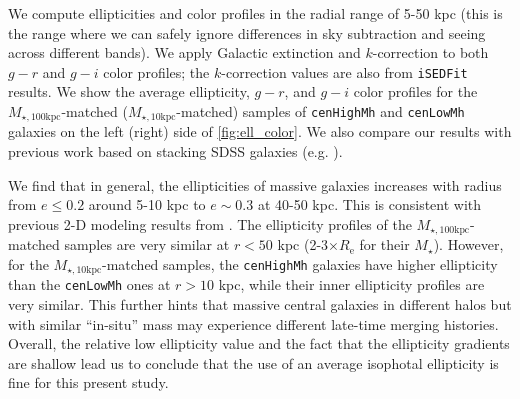 \documentclass[a4paper,fleqn,usenatbib]{mnras}
\def\rbcg{\texttt{cenHighMh}}
\def\nbcg{\texttt{cenLowMh}}
\def\mstar{{$M_{\star}$}}
\def\minn{{$M_{\star,10\mathrm{kpc}}$}}
\def\mtot{{$M_{\star,100\mathrm{kpc}}$}}
\def\m2l{{$M_{\star}/L_{\star}$}}
\def\mden{{$\mu_{\star}$}}
\begin{document}

    We compute ellipticities and color profiles in the radial range of 5-50 kpc 
    (this is the range where we can safely ignore differences in sky subtraction and 
    seeing across different bands). 
    We apply Galactic extinction and $k$-correction to both $g-r$ and $g-i$ color 
    profiles; the $k$-correction values are also from \texttt{iSEDFit} results.
    We show the average ellipticity, $g-r$, and $g-i$ color profiles for the 
    \mtot{}-matched (\minn{}-matched) samples of \rbcg{} and \nbcg{} galaxies on the 
    left (right) side of \ref{fig:ell_color}. 
    We also compare our results with previous work based on stacking SDSS galaxies 
    (e.g. \citealt{LaBarbera2010, Tal2011, DSouza2014}).
    
    We find that in general, the ellipticities of massive galaxies increases with 
    radius from $e\le 0.2$ around 5-10 kpc to $e{\sim} 0.3$ at 40-50 kpc. 
    This is consistent with previous 2-D modeling results from \citet{Huang2013a}. 
    The ellipticity profiles of the \mtot{}-matched samples are very similar at 
    $r<50$ kpc (2-3$\times R_{\mathrm{e}}$ for their \mstar{}). 
    However, for the \minn{}-matched samples, the \rbcg{} galaxies have higher 
    ellipticity than the \nbcg{} ones at $r > 10$ kpc, while their inner ellipticity 
    profiles are very similar.  
    This further hints that massive central galaxies in different halos but with 
    similar ``in-situ'' mass may experience different late-time merging histories. 
    Overall, the relative low ellipticity value and the fact that the ellipticity 
    gradients are shallow lead us to conclude that the use of an average 
    isophotal ellipticity is fine for this present study.
            
\end{document}
